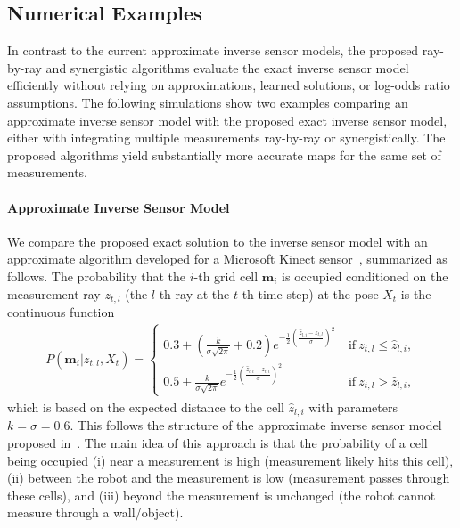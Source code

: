 \subsection{Numerical Examples}

In contrast to the current approximate inverse sensor models, the proposed ray-by-ray and synergistic algorithms evaluate the exact inverse sensor model efficiently without relying on approximations, learned solutions, or log-odds ratio assumptions. The following simulations show two examples comparing an approximate inverse sensor model with the proposed exact inverse sensor model, either with integrating multiple measurements ray-by-ray or synergistically. The proposed algorithms yield substantially more accurate maps for the same set of measurements.


\paragraph{Approximate Inverse Sensor Model}

We compare the proposed exact solution to the inverse sensor model with an approximate algorithm developed for a Microsoft Kinect sensor~\cite{PirRutBisSch11,KhoElb12}, summarized as follows. The probability that the $i$-th grid cell $\mathbf{m}_i$ is occupied conditioned on the measurement ray $z_{t,l}$ (the $l$-th ray at the $t$-th time step) at the pose $X_t$ is the continuous function
\begin{align}
\label{eqn:ISM_Approx_1}
P(\mathbf{m}_i|z_{t,l},X_t)=\begin{cases}
0.3+(\frac{k}{\sigma\sqrt{2\pi}}+0.2)e^{-\frac12\left(\frac{\hat z_{l,i}-z_{t,l}}{\sigma}\right)^2}\ &\text{if}\ z_{t,l}\leq \hat z_{l,i},
\\
0.5+\frac{k}{\sigma\sqrt{2\pi}}e^{-\frac12\left(\frac{\hat z_{l,i}-z_{t,l}}{\sigma}\right)^2}\ &\text{if}\ z_{t,l}>\hat z_{l,i},
\end{cases}
\end{align}
which is based on the expected distance to the cell $\hat z_{l,i}$ with parameters $k=\sigma=0.6$. This follows the structure of the approximate inverse sensor model proposed in~\cite{Andert09}. The main idea of this approach is that the probability of a cell being occupied (i) near a measurement is high (measurement likely hits this cell), (ii) between the robot and the measurement is low (measurement passes through these cells), and (iii) beyond the measurement is unchanged (the robot cannot measure through a wall/object). 

